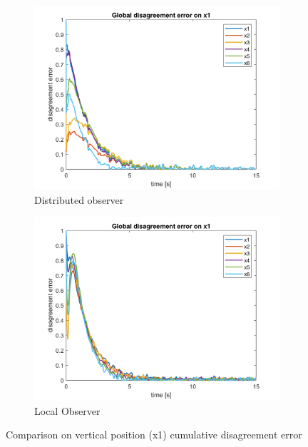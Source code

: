 \begin{figure}[H]
    \begin{subfigure}{0.45\textwidth}
        \centering
        \includegraphics[width=\textwidth]{img/dist/global_error_x1_noise_dist.png}
        \caption{Distributed observer}
    \end{subfigure}
    \hfill
    \begin{subfigure}{0.45\textwidth}
        \centering
        \includegraphics[width=\textwidth]{img/local/global_error_x1_noise_local.png}
        \caption{Local Observer}
    \end{subfigure}
    \caption{Comparison on vertical position (x1) cumulative disagreement error}
    \label{fig:x1_error}
\end{figure}

